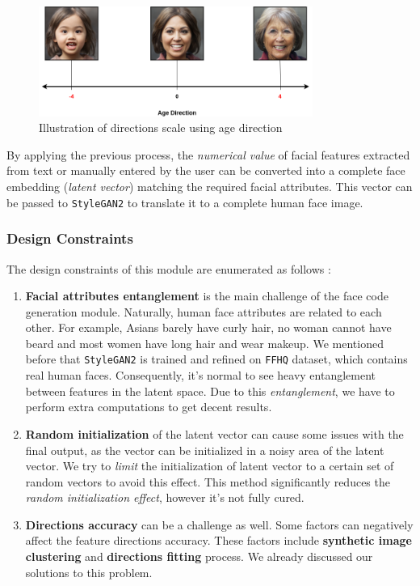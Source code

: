\begin{figure}[H]
    \centering
    \includegraphics[width=0.8\textwidth]{images/dir-scale.png}
    \caption{Illustration of directions scale using age direction}
    \label{fig:dir_scale}
\end{figure}

By applying the previous process, the \emph{numerical value} of facial features extracted from text or manually entered by the user can be converted into a complete face embedding (\emph{latent vector}) matching the required facial attributes. This vector can be passed to \texttt{StyleGAN2} to translate it to a complete human face image.

\subsubsection{Design Constraints}

The design constraints of this module are enumerated as follows :
\begin{enumerate}
    \item \textbf{Facial attributes entanglement} is the main challenge of the face code generation module. Naturally, human face attributes are related to each other. For example, Asians barely have curly hair, no woman cannot have beard and most women have long hair and wear makeup. We mentioned before that \texttt{StyleGAN2} is trained and refined on \texttt{FFHQ} dataset, which contains real human faces. Consequently, it's normal to see heavy entanglement between features in the latent space. Due to this \emph{entanglement}, we have to perform extra computations to get decent results.
    \item \textbf{Random initialization} of the latent vector can cause some issues with the final output, as the vector can be initialized in a noisy area of the latent vector. We try to \emph{limit} the initialization of latent vector to a certain set of random vectors to avoid this effect. This method significantly reduces the \emph{random initialization effect}, however it's not fully cured.
    \item \textbf{Directions accuracy} can be a challenge as well. Some factors can negatively affect the feature directions accuracy. These factors include \textbf{synthetic image clustering} and \textbf{directions fitting} process. We already discussed our solutions to this problem.
\end{enumerate}
